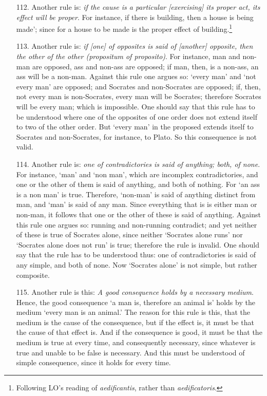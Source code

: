 \documentclass[]{article}
\begin{document}
\begin{itemize}
\item[112.] Another rule is: \textit{if the cause is a particular [exercising] its proper act, its effect will be proper}. For instance, if there is building, then a house is being made'; since for a house to be made is the proper effect of building.\footnote{Following LO's reading of \textit{aedificantis}, rather than \textit{aedificatoris}.}
\item[113.] Another rule is: \textit{if [one] of opposites is said of [another] opposite, then the other of the other (\textit{propositum} of \textit{proposito})}. For instance, man and non-man are opposed, ass and non-ass are opposed; if man, then, is a non-ass, an ass will be a non-man. Against this rule one argues so: `every man' and `not every man' are opposed; and Socrates and non-Socrates are opposed; if, then, not every man is non-Socrates, every man will be Socrates; therefore Socrates will be every man; which is impossible. One should say that this rule has to be understood where one of the opposites of one order does not extend itself to two of the other order. But `every man' in the proposed extends itself to Socrates and non-Socrates, for instance, to Plato. So this consequence is not valid.
\item[114.] Another rule is: \textit{one of contradictories is said of anything; both, of none}. For instance, `man' and `non man', which are incomplex contradictories, and one or the other of them is said of anything, and both of nothing. For `an ass is a non man' is true. Therefore, `non-man' is said of anything distinct from man, and `man' is said of any man. Since everything that is is either man or non-man, it follows that one or the other of these is said of anything. Against this rule one argues so: running and non-running contradict; and yet neither of these is true of Socrates alone, since neither `Socrates alone runs' nor `Socrates alone does not run' is true; therefore the rule is invalid. One should say that the rule has to be understood thus: one of contradictories is said of any simple, and both of none. Now `Socrates alone' is not simple, but rather composite. 
\item[115.] Another rule is this: \textit{A good consequence holds by a necessary medium}. Hence, the good consequence `a man is, therefore an animal is' holds by the medium `every man is an animal.' The reason for this rule is this, that the medium is the cause of the consequence, but if the effect is, it must be that the cause of that effect is. And if the consequence is good, it must be that the medium is true at every time, and consequently necessary, since whatever is true and unable to be false is necessary. And this must be understood of simple consequence, since it holds for every time.

\end{itemize}
\end{document}
